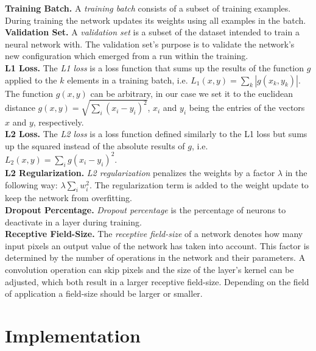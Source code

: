 \noindent\textbf{Training Batch.} A \textit{training batch} consists of a subset of training examples. During training the network updates its weights using all examples in the batch. \\

\noindent\textbf{Validation Set.} A \textit{validation set} is a subset of the dataset intended to train a neural network with. The validation set's purpose is to validate the network's new configuration which emerged from a run within the training. \\

\noindent\textbf{L1 Loss.} The \textit{L1 loss} is a loss function that sums up the results of the function $g$ applied to the $k$ elements in a training batch, i.e. $L_1(x, y) = \sum\limits_k |g(x_k, y_k)|$. The function $g(x, y)$ can be arbitrary, in our case we set it to the euclidean distance $g(x, y) = \sqrt{\sum\limits_i (x_i - y_i)^2}$, $x_i$ and $y_i$ being the entries of the vectors $x$ and $y$, respectively. \\

\noindent\textbf{L2 Loss.} The \textit{L2 loss} is a loss function defined similarly to the L1 loss but sums up the squared instead of the absolute results of $g$, i.e. $L_2(x, y) = \sum\limits_i g(x_i - y_i)^2$. \\

\noindent\textbf{L2 Regularization.} \textit{L2 regularization} penalizes the weights by a factor $\lambda$ in the following way: $\lambda \sum\limits_i w_i^2$. The regularization term is added to the weight update to keep the network from overfitting. \\

\noindent\textbf{Dropout Percentage.} \textit{Dropout percentage} is the percentage of neurons to deactivate in a layer during training. \\

\noindent\textbf{Receptive Field-Size.} The \textit{receptive field-size} of a network denotes how many input pixels an output value of the network has taken into account. This factor is determined by the number of operations in the network and their parameters. A convolution operation can skip pixels and the size of the layer's kernel can be adjusted, which both result in a larger receptive field-size. Depending on the field of application a field-size should be larger or smaller.

\section{Implementation}

